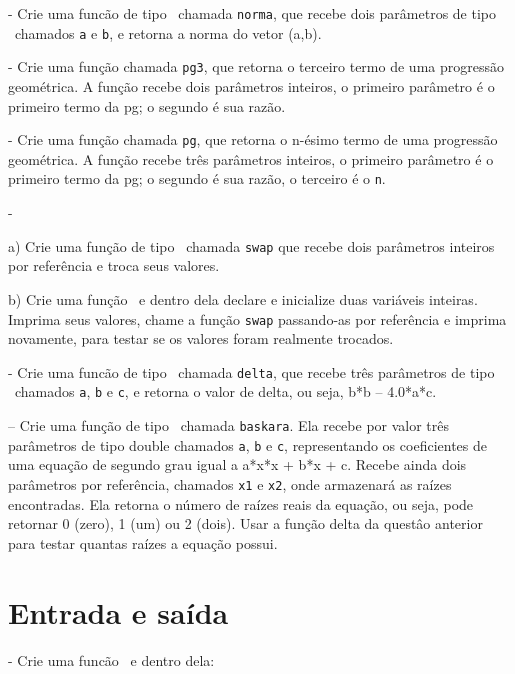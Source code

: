 \NEWLINE
\quest - Crie uma funcão de tipo \DOUBLE\ chamada {\tt norma}, que recebe dois parâmetros de tipo \DOUBLE\ chamados {\tt a} e {\tt b}, e retorna a norma do vetor (a,b).


\NEWLINE
\quest - Crie uma função chamada {\tt pg3}, que retorna o terceiro termo de uma progressão geométrica. A função recebe dois parâmetros inteiros, o primeiro parâmetro é o primeiro termo da pg; o segundo é sua razão.

\NEWLINE
\quest - Crie uma função chamada {\tt pg}, que retorna o n-ésimo termo de uma progressão geométrica. A função recebe três parâmetros inteiros, o primeiro parâmetro é o primeiro termo da pg; o segundo é sua razão, o terceiro é o {\tt n}.

\NEWLINE
\quest -

a) Crie uma função de tipo \VOID\ chamada {\tt swap} que recebe dois parâmetros inteiros por referência e troca seus valores.

b) Crie uma função  \MAIN\ e dentro dela declare e inicialize duas variáveis inteiras. Imprima seus valores, chame a função {\tt swap} passando-as por referência e imprima novamente, para testar se os valores foram realmente trocados.

\NEWLINE
\quest - Crie uma funcão de tipo \DOUBLE\ chamada {\tt delta}, que recebe três parâmetros de tipo \DOUBLE\ chamados {\tt a}, {\tt b} e {\tt c}, e retorna o valor de delta, ou seja, b*b – 4.0*a*c.

\NEWLINE
\quest – Crie uma função de tipo \INT\ chamada {\tt baskara}. Ela recebe por valor três parâmetros de tipo double chamados {\tt a}, {\tt b} e {\tt c}, representando os coeficientes de uma equação de segundo grau igual a a*x*x + b*x + c. Recebe ainda dois parâmetros por referência, chamados {\tt x1} e {\tt x2}, onde armazenará as raízes encontradas. Ela retorna o número de raízes reais da equação, ou seja, pode retornar 0 (zero), 1 (um) ou 2 (dois). Usar a função  delta da questâo anterior para testar quantas raízes a equação possui.




\zeraquest

\section{Entrada e saída}


\NEWLINE
\quest - Crie uma funcão \MAIN\ e dentro dela:

